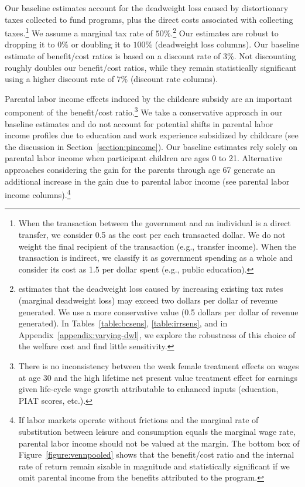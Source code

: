 Our baseline estimates account for the deadweight loss caused by distortionary taxes collected to fund programs, plus the direct costs associated with collecting taxes.\footnote{When the transaction between the government and an individual is a direct transfer, we consider 0.5 as the cost per each transacted dollar. We do not weight the final recipient of the transaction (e.g., transfer income). When the transaction is indirect, we classify it as government spending as a whole and consider its cost as 1.5 per dollar spent (e.g., public education).} We assume a marginal tax rate of $50\%$.\footnote{\citet{Feldstein_1999_REStat} estimates that the deadweight loss caused by increasing existing tax rates (marginal deadweight loss) may exceed two dollars per dollar of revenue generated. We use a more conservative value (0.5 dollars per dollar of revenue generated). In Tables~\ref{table:bcsens}, \ref{table:irrsens}, and in  Appendix~\ref{appendix:varying-dwl}, we explore the robustness of this choice of the welfare cost and find little sensitivity.} Our estimates are robust to dropping it to $0\%$ or doubling it to $100\%$ (deadweight loss columns). Our baseline estimate of benefit/cost ratios is based on a discount rate of $3\%$. Not discounting roughly doubles our benefit/cost ratios, while they remain statistically significant using a higher discount rate of $7\%$ (discount rate columns).

Parental labor income effects induced by the childcare subsidy are an important component of the benefit/cost ratio.\footnote{There is no inconsistency between the weak female treatment effects on wages at age 30 and the high lifetime net present value treatment effect for earnings given life-cycle wage growth attributable to enhanced inputs (education, PIAT scores, etc.).} We take a conservative approach in our baseline estimates and do not account for potential shifts in parental labor income profiles due to education and work experience subsidized by childcare (see the discussion in Section~\ref{section:pincome}). Our baseline estimates rely solely on parental labor income when participant children are ages 0 to 21. Alternative approaches considering the gain for the parents through age 67 generate an additional increase in the gain due to parental labor income (see parental labor income columns).\footnote{If labor markets operate without frictions and the marginal rate of substitution between leisure and consumption equals the marginal wage rate, parental labor income should not be valued at the margin. The bottom box of Figure~\ref{figure:vennpooled} shows that the benefit/cost ratio and the internal rate of return remain sizable in magnitude and statistically significant if we omit parental income from the benefits attributed to the program.}

